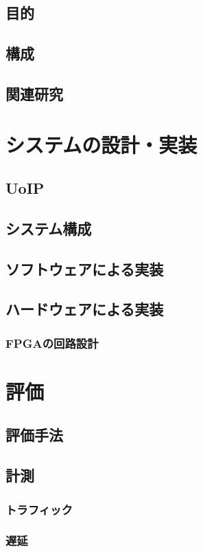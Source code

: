 \section{目的}
\section{構成}
\section{関連研究}

\chapter{システムの設計・実装}
\label{chap:implementation}
\section{UoIP} %
\section{システム構成}
\section{ソフトウェアによる実装}
\section{ハードウェアによる実装}
\subsection{FPGAの回路設計}

\chapter{評価}
\label{chap:evaluation}
\section{評価手法}
\section{計測}
\subsection{トラフィック}
\subsection{遅延}
